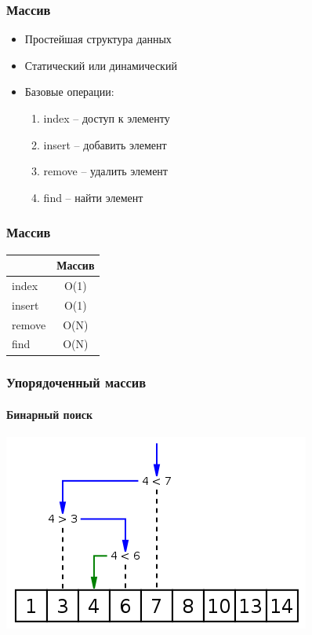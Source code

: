 \documentclass[14pt,pdf,hyperref={unicode}]{beamer}
\begin{document}
\begin{frame}[fragile]
\frametitle{Массив}
\begin{itemize}
\item Простейшая структура данных \\
\item Статический или динамический \\
\item Базовые операции:
\begin{enumerate}
\item index  --  доступ к элементу
\item insert --  добавить элемент
\item remove --  удалить элемент
\item find   --  найти элемент
\end{enumerate}
\end{itemize}
\end{frame}


\begin{frame}[fragile]
\frametitle{Массив}
\begin{center}
  \begin{tabular}{  l | c }
      & Массив \\
    \hline
    index & O(1) \\
    insert & O(1)  \\
    remove & O(N) \\
    find & O(N)  \\
    \hline
  \end{tabular}
\end{center}
\end{frame}


\begin{frame}[fragile]
\frametitle{Упорядоченный массив}
\framesubtitle{Бинарный поиск} 
\begin{center}
\includegraphics[width=0.7\linewidth]{images/Binary_search_into_array.png}
\end{center}
\end{frame}
\end{document}
